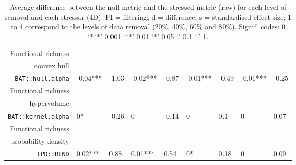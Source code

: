 \begin{table}[ht]
\begin{tabular}{rllllllll}
  Functional richness\\convex hull\\\texttt{BAT::hull.alpha} & -0.04*** & -1.03 & -0.02*** & -0.87 & -0.01*** & -0.49 & -0.01*** & -0.25 \\ 
  Functional richness\\hypervolume\\\texttt{BAT::kernel.alpha} & 0* & -0.26 & 0 & -0.14 & 0 & 0.1 & 0 & 0.07 \\ 
  Functional richness\\probability density\\\texttt{TPD::REND} & 0.02*** & 0.88 & 0.01*** & 0.54 & 0* & 0.18 & 0 & 0.09 \\ 
   \hline
\end{tabular}
\caption{Average difference between the null metric and the stressed metric (raw) for each level of removal and each stressor (4D). FI = filtering; d = difference, s = standardised effect size; 1 to 4 correspond to the levels of data removal (20\%, 40\%, 60\% and 80\%). Signif. codes:  0 ‘***’ 0.001 ‘**’ 0.01 ‘*’ 0.05 ‘.’ 0.1 ‘ ’ 1.} 
\end{table}
